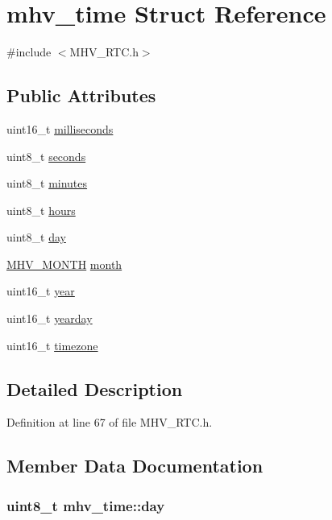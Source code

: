 \hypertarget{structmhv__time}{
\section{mhv\-\_\-time \-Struct \-Reference}
\label{structmhv__time}
}


{\ttfamily \#include $<$\-M\-H\-V\-\_\-\-R\-T\-C.\-h$>$}

\subsection*{\-Public \-Attributes}
\begin{DoxyCompactItemize}
\item 
uint16\-\_\-t \hyperlink{structmhv__time_a88f1e6b1d010c2f21b11bd335b1fae65}{milliseconds}
\item 
uint8\-\_\-t \hyperlink{structmhv__time_a4844293af0a3648391fb9335f2aa758c}{seconds}
\item 
uint8\-\_\-t \hyperlink{structmhv__time_a72c1e9925d2d3de254c6550c0b309347}{minutes}
\item 
uint8\-\_\-t \hyperlink{structmhv__time_a86216ab6b58bede2c74b8b38745c81f7}{hours}
\item 
uint8\-\_\-t \hyperlink{structmhv__time_aa20dafe05aae315fff313d53656c6318}{day}
\item 
\hyperlink{_m_h_v___r_t_c_8h_a98c5fb7fa4cf35056e932e294af7cbb5}{\-M\-H\-V\-\_\-\-M\-O\-N\-T\-H} \hyperlink{structmhv__time_a832c57e459789022fb39b7c704a3e926}{month}
\item 
uint16\-\_\-t \hyperlink{structmhv__time_ab5441551ca64fde709afdc98fa5c851e}{year}
\item 
uint16\-\_\-t \hyperlink{structmhv__time_aa5e9d8969550c007c40f6b2dd404d3d6}{yearday}
\item 
uint16\-\_\-t \hyperlink{structmhv__time_abe9ad1b2bfd43e6688c07367a279c50b}{timezone}
\end{DoxyCompactItemize}


\subsection{\-Detailed \-Description}


\-Definition at line 67 of file \-M\-H\-V\-\_\-\-R\-T\-C.\-h.



\subsection{\-Member \-Data \-Documentation}
\hypertarget{structmhv__time_aa20dafe05aae315fff313d53656c6318}{
\subsubsection[{day}]{\setlength{\rightskip}{0pt plus 5cm}uint8\-\_\-t {\bf mhv\-\_\-time\-::day}}}
\label{structmhv__time_aa20dafe05aae315fff313d53656c6318}


